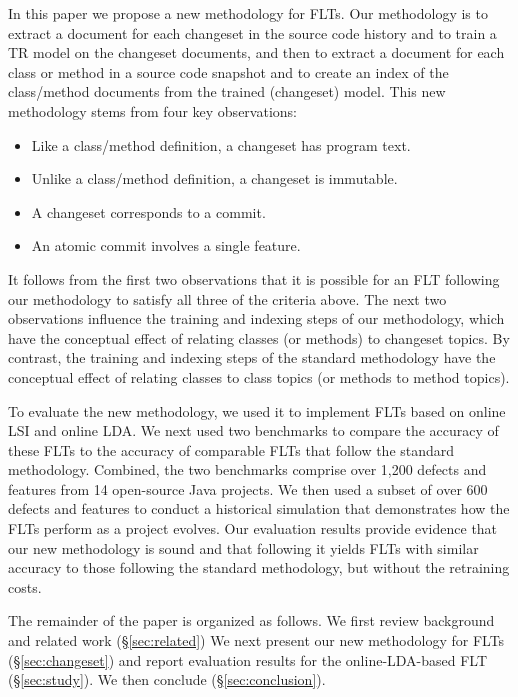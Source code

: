 In this paper we propose a new methodology for FLTs.
Our methodology is to extract a document for each changeset in the source code history and to train a TR model on the changeset documents, and then to extract a document for each class or method in a source code snapshot and to create an index of the class/method documents from the trained (changeset) model.
This new methodology stems from four key observations:
\begin{itemize}[leftmargin=*]
  \item
    Like a class/method definition, a changeset has program text.
  \item
    Unlike a class/method definition, a changeset is immutable.
  \item
    A changeset corresponds to a commit.
  \item
    An atomic commit involves a single feature.
\end{itemize}
It follows from the first two observations that it is possible for an FLT following our methodology to satisfy all three of the criteria above.
The next two observations influence the training and indexing steps of our methodology,
which have the conceptual effect of relating classes (or methods) to changeset topics.
By contrast, the training and indexing steps of the standard methodology
have the conceptual effect of relating classes to class topics (or methods to method topics).

To evaluate the new methodology, we used it to implement FLTs based on online LSI and online LDA.
We next used two benchmarks to compare the accuracy of these FLTs to the accuracy of comparable FLTs that follow the standard methodology.
Combined, the two benchmarks comprise over 1,200 defects and features from 14 open-source Java projects.
We then used a subset of over 600 defects and features to conduct a historical simulation that demonstrates how the FLTs perform as a project evolves.
Our evaluation results provide evidence that our new methodology is sound and that following it yields FLTs with similar accuracy to those following the standard methodology, but without the retraining costs.

The remainder of the paper is organized as follows.
We first review background and related work (\S\ref{sec:related})
We next present our new methodology for FLTs (\S\ref{sec:changeset}) and report evaluation results for the online-LDA-based FLT (\S\ref{sec:study}).
We then conclude (\S\ref{sec:conclusion}).




